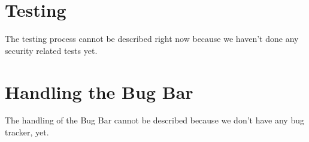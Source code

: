 \section{Testing}

The testing process cannot be described right now because we haven't done any security related tests yet. 

\section{Handling the Bug Bar}

The handling of the Bug Bar cannot be described because we don't have any bug tracker, yet.
